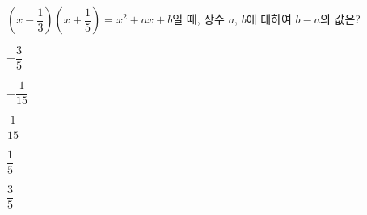$\left(x-\dfrac{1}{3}\right)\left(x+\dfrac{1}{5}\right)=x^2+ax+b$일 때, 상수 $a$, $b$에 대하여 $b-a$의 값은?
\begin{choices32}{\rule[-3ex]{0pt}{8ex}$-\dfrac{3}{5}$}{\rule[-3ex]{0pt}{8ex}$-\dfrac{1}{15}$}{\rule[-3ex]{0pt}{8ex}$\dfrac{1}{15}$}{\rule[-3ex]{0pt}{8ex}$\dfrac{1}{5}$}{\rule[-3ex]{0pt}{8ex}$\dfrac{3}{5}$}\end{choices32}
